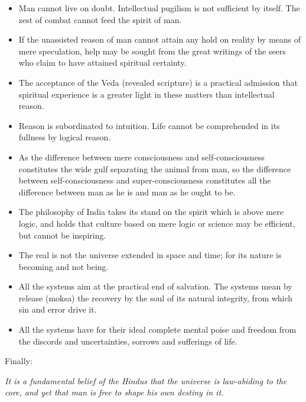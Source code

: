 \begin{itemize}
\item Man cannot live on doubt. Intellectual pugilism is not sufficient by itself. The zest of combat cannot feed the spirit of man.

\item If the unassisted reason of man cannot attain any hold on reality by means of mere speculation, help may be sought from the great writings of the seers who claim to have attained spiritual certainty.

\item The acceptance of the Veda (revealed scripture) is a practical admission that spiritual experience is a greater light in these matters than intellectual reason.

\item Reason is subordinated to intuition. Life cannot be comprehended in its fullness by logical reason.

\item As the difference between mere consciousness and self-consciousness constitutes the wide gulf separating the animal from man, so the difference between self-consciousness and super-consciousness constitutes all the difference between man as he is and man as he ought to be.

\item The philosophy of India takes its stand on the spirit which is above mere logic, and holds that culture based on mere logic or science may be efficient, but cannot be inspiring.

\item The real is not the universe extended in space and time; for its nature is becoming and not being.

\item All the systems aim at the practical end of salvation. The systems mean by release (moksa) the recovery by the soul of its natural integrity, from which sin and error drive it.

\item All the systems have for their ideal complete mental poise and freedom from the discords and uncertainties, sorrows and sufferings of life.
\end{itemize}


Finally:

\textit{It is a fundamental belief of the Hindus that the universe is law-abiding to the core, and yet that man is free to shape his own destiny in it.}



